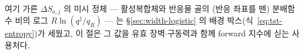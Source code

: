 여기 가른 $\Delta S_{a,j}$ 의 미시 정체 --- 활성복합체와 반응물 골의 (반응 좌표를 뗀) 분배함수 비의 로그
$R\ln(q^\ddagger/q_R)$ --- 는 \S\ref{sec:width-logistic} 의 배경 박스(식~\eqref{eq:tst-entropy})가
세웠고, 이 절은 그 값을 유효 장벽$\cdot$구동력과 함께 forward 지수에 싣는 사용처다.


